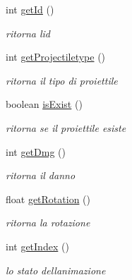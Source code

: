 \begin{DoxyCompactItemize}
int \hyperlink{classobjects_1_1_projectile_a67283be3f45257d1e0c474c563ebb6b6}{get\+Id} ()
\begin{DoxyCompactList}\small\item\em ritorna l\textquotesingle{}id \end{DoxyCompactList}\item 
int \hyperlink{classobjects_1_1_projectile_a2dbf5e3a5bf7a6d90d11cb469b59776b}{get\+Projectiletype} ()
\begin{DoxyCompactList}\small\item\em ritorna il tipo di proiettile \end{DoxyCompactList}\item 
boolean \hyperlink{classobjects_1_1_projectile_a7c498cab7528e704f34b7373e817e066}{is\+Exist} ()
\begin{DoxyCompactList}\small\item\em ritorna se il proiettile esiste \end{DoxyCompactList}\item 
int \hyperlink{classobjects_1_1_projectile_a3eb7b7894f5f3b1409005aecd00a38ad}{get\+Dmg} ()
\begin{DoxyCompactList}\small\item\em ritorna il danno \end{DoxyCompactList}\item 
float \hyperlink{classobjects_1_1_projectile_aa60864de0b3c57fee5ae403229f41228}{get\+Rotation} ()
\begin{DoxyCompactList}\small\item\em ritorna la rotazione \end{DoxyCompactList}\item 
int \hyperlink{classobjects_1_1_projectile_a59d053c950ff1e9f8a004d493f34e754}{get\+Index} ()
\begin{DoxyCompactList}\small\item\em lo stato dell\textquotesingle{}animazione \end{DoxyCompactList}\end{DoxyCompactItemize}

